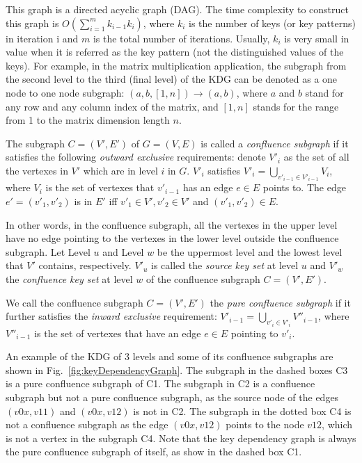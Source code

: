 \documentclass[10pt,journal,compsoc]{IEEEtran}
\begin{document}
This graph is a directed acyclic graph (DAG).
The time complexity to construct this graph is $O(\sum_{i=1}^m k_{i-1} k_i)$, 
where $k_i$ is the number of keys (or key patterns) in iteration i and $m$ is the total number of iterations.
Usually, $k_i$ is very small in value when it is referred as the key pattern (not the distinguished values of the keys).
For example, in the matrix multiplication application, the subgraph from the second level to the third (final level) of the KDG can be denoted as a one node to one node subgraph: $(a, b, [1, n]) \rightarrow (a, b)$, 
where $a$ and $b$ stand for any row and any column index of the matrix, 
and $[1, n]$ stands for the range from 1 to the matrix dimension length $n$.

The subgraph $C=(V', E')$ of $G=(V,E)$ is called a \emph{confluence subgraph} if it satisfies the following
\emph{outward exclusive} requirements: 
denote $V'_i$ as the set of all the vertexes in $V'$ which are in level $i$ in $G$.  
$V'_i$ satisfies $V'_i=\bigcup_{v'_{i-1} \in V'_{i-1}}V_i$, where $V_i$ is the set of vertexes that $v'_{i-1}$ has an edge $e \in E$ points to. 
The edge $e' =(v'_1,v'_2)$ is in $E'$ iff $v'_1 \in V', v'_2 \in V'$ and $(v'_1,v'_2) \in E$.

In other words, in the confluence subgraph, all the vertexes in the upper level have no edge pointing to
the vertexes in the lower level outside the confluence subgraph. 
Let Level $u$ and Level $w$ be the uppermost level and the lowest level that $V'$ contains, respectively. 
$V'_u$ is called the \emph{source key set} at level $u$ and $V'_w$ the \emph{confluence key set} at level $w$
of the confluence subgraph $C=(V',E')$. 

We call the confluence subgraph $C=(V', E')$ the \emph{pure confluence subgraph} if 
it further satisfies the \emph{inward exclusive} requirement: 
$V'_{i-1}=\bigcup_{v'_i \in V'_i}V''_{i-1}$, where $V''_{i-1}$ is the set of vertexes that have an edge $e \in E$ pointing to $v'_i$. 


An example of the KDG of 3 levels and some of its confluence subgraphs are shown in Fig.~\ref{fig:keyDependencyGraph}. The subgraph in the dashed boxes C3 is a pure confluence subgraph 
of C1. The subgraph in C2 is a confluence subgraph but not a pure confluence subgraph, 
as the source node of the edges $(v0x, v11)$ and $(v0x, v12)$ is not in C2. 
The subgraph in the dotted box C4 is not a confluence subgraph as the edge $(v0x, v12)$ 
points to the node $v12$, which is not a vertex in the subgraph C4. 
Note that the key dependency graph is always the pure confluence subgraph of itself, as show in the dashed box C1. 
\end{document}
